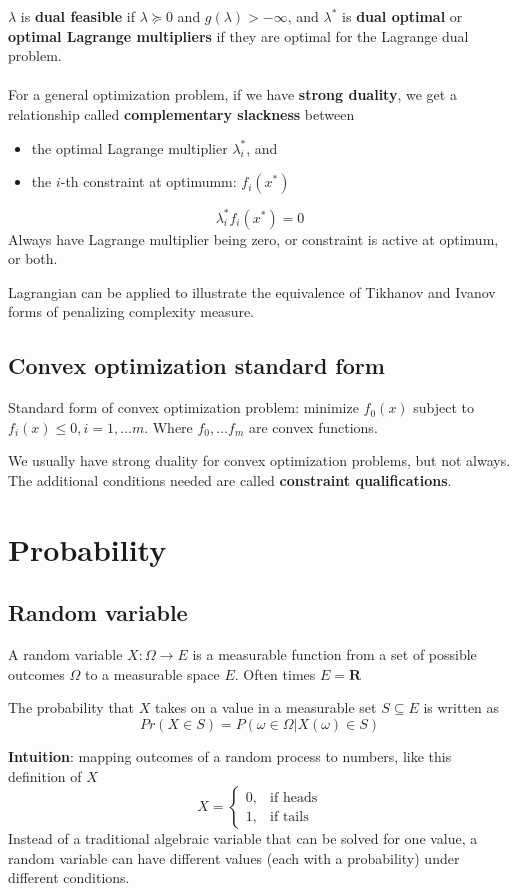 \documentclass{article}
\begin{document}
$\lambda$ is \textbf{dual feasible} if $\lambda \succeq 0$ and $g(\lambda) > -\infty$, and $\lambda^*$ is \textbf{dual optimal} or \textbf{optimal Lagrange multipliers} if they are optimal for the Lagrange dual problem.
\\
\\
For a general optimization problem, if we have \textbf{strong duality}, we get a relationship called \textbf{complementary slackness} between
\begin{itemize}
  \item the optimal Lagrange multiplier $\lambda_i^*$, and
  \item the $i$-th constraint at optimumm: $f_i(x^*)$
\end{itemize}
$$
\lambda_i^* f_i(x^*) = 0
$$
Always have Lagrange multiplier being zero, or constraint is active at optimum, or both.

Lagrangian can be applied to illustrate the equivalence of Tikhanov and Ivanov forms of penalizing complexity measure.

\subsection{Convex optimization standard form}

Standard form of convex optimization problem: minimize $f_0(x)$ subject to $f_i(x) \leq 0, i = 1, \dots m$.
Where $f_0, \dots f_m$ are convex functions.

We usually have strong duality for convex optimization problems, but not always.
The additional conditions needed are called \textbf{constraint qualifications}.

\section{Probability}

\subsection{Random variable}

A random variable $X : \Omega \to \mathit{E}$ is a measurable function from a set of possible outcomes $\Omega$ to a measurable space $\mathit{E}$.
Often times $\mathit{E} = \mathbf{R}$

The probability that $X$ takes on a value in a measurable set $S \subseteq \mathit{E}$ is written as
$$
Pr(X \in S) = P({\omega \in \Omega | X(\omega) \in S})
$$

\textbf{Intuition}: mapping outcomes of a random process to numbers, like this definition of $X$
$$
X =
\begin{cases}
0, & \text{if heads} \\
1, & \text{if tails}
\end{cases}
$$
Instead of a traditional algebraic variable that can be solved for one value, a random variable can have different values (each with a probability) under different conditions.
\end{document}
